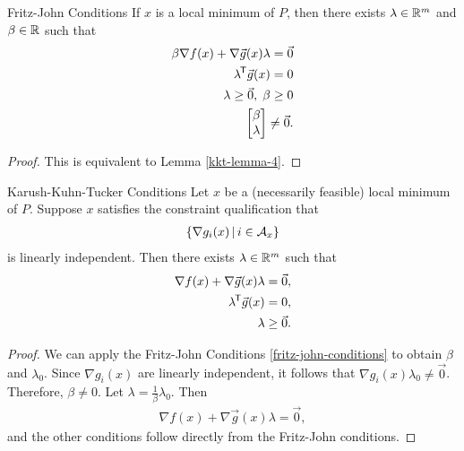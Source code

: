 \begin{thm}{Fritz-John Conditions}\label{fritz-john-conditions}\proofbreak
    If $x$ is a local minimum of $P$, then there exists $\lambda \in \mathbb{R}^m$ and $\beta \in \mathbb{R}$ such that
    \begin{align*}
        \beta\nabla f(x) + \nabla \vec{g}(x)\lambda = \vec{0} \\
        {\lambda}^{\mkern-1.5mu\mathsf{T}}\vec{g}(x) = 0 \\
        \lambda \geq \vec{0},\;\beta \geq 0 \\
        \begin{bmatrix}
            \beta \\ \lambda
        \end{bmatrix} \neq \vec{0}.
    \end{align*}
\end{thm}

\begin{proof}
    This is equivalent to Lemma \ref{kkt-lemma-4}.
\end{proof}

\begin{thm}{Karush-Kuhn-Tucker Conditions}\label{kkt-conditions}\proofbreak
    Let $x$ be a (necessarily feasible) local minimum of $P$. Suppose $x$ satisfies the constraint qualification that
    \begin{align}
        \left\{\nabla g_i(x) \,\middle|\, i \in \mathcal{A}_x\right\}
    \end{align}
    is linearly independent. Then there exists $\lambda \in \mathbb{R}^m$ such that
    \begin{align*}
        \nabla f(x) + \nabla \vec{g}(x)\lambda = \vec{0}, \\
        {\lambda}^{\mkern-1.5mu\mathsf{T}}\vec{g}(x) = 0, \\
        \lambda \geq \vec{0}.
    \end{align*}
\end{thm}

\begin{proof}
    We can apply the Fritz-John Conditions \ref{fritz-john-conditions} to obtain $\beta$ and $\lambda_0$. Since $\nabla g_i(x)$ are linearly independent, it follows that $\nabla g_i(x)\lambda_0 \neq \vec{0}$. Therefore, $\beta \neq 0$. Let $\lambda = \frac{1}{\beta}\lambda_0$. Then
    \begin{align*}
        \nabla f(x) + \nabla \vec{g}(x)\lambda = \vec{0},
    \end{align*}
    and the other conditions follow directly from the Fritz-John conditions.
\end{proof}

